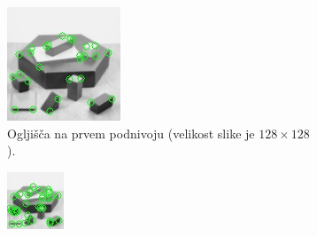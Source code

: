 \documentclass[a4paper,11pt]{article}
\begin{document}
\begin{figure}[h!b]
\begin{subfigure}[t]{0.48\textwidth}
		\includegraphics[width=\textwidth]{images/blox_corners_L1.jpg}
		\caption{Ogljišča na prvem podnivoju (velikost slike je $128\times128$).}
		\label{img:kp_L1}
	\end{subfigure}
	\begin{subfigure}[t]{0.48\textwidth}
		\centering
		\includegraphics[width=\textwidth]{images/blox_corners_L2.jpg}

\end{subfigure}
\end{figure}
\end{document}
